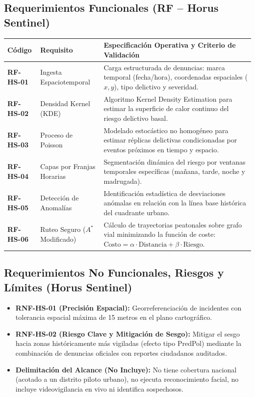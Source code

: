 \documentclass[11pt,a4paper]{article}
\begin{document}
\subsection{Requerimientos Funcionales (RF -- Horus Sentinel)}
\noindent\begin{tabularx}{\textwidth}{p{2.3cm} p{4.6cm} X}
\toprule
\textbf{Código} & \textbf{Requisito} & \textbf{Especificación Operativa y Criterio de Validación} \\
\midrule
\textbf{RF-HS-01} & Ingesta Espaciotemporal & Carga estructurada de denuncias: marca temporal (fecha/hora), coordenadas espaciales ($x,y$), tipo delictivo y severidad. \\
\addlinespace[3pt]
\textbf{RF-HS-02} & Densidad Kernel (KDE) & Algoritmo Kernel Density Estimation para estimar la superficie de calor continuo del riesgo delictivo basal. \\
\addlinespace[3pt]
\textbf{RF-HS-03} & Proceso de Poisson & Modelado estocástico no homogéneo para estimar réplicas delictivas condicionadas por eventos próximos en tiempo y espacio. \\
\addlinespace[3pt]
\textbf{RF-HS-04} & Capas por Franjas Horarias & Segmentación dinámica del riesgo por ventanas temporales específicas (mañana, tarde, noche y madrugada). \\
\addlinespace[3pt]
\textbf{RF-HS-05} & Detección de Anomalías & Identificación estadística de desviaciones anómalas en relación con la línea base histórica del cuadrante urbano. \\
\addlinespace[3pt]
\textbf{RF-HS-06} & Ruteo Seguro ($A^*$ Modificado) & Cálculo de trayectorias peatonales sobre grafo vial minimizando la función de coste: $\text{Costo} = \alpha \cdot \text{Distancia} + \beta \cdot \text{Riesgo}$. \\
\bottomrule
\end{tabularx}

\subsection{Requerimientos No Funcionales, Riesgos y Límites (Horus Sentinel)}
\begin{itemize}[leftmargin=*]
    \item \textbf{RNF-HS-01 (Precisión Espacial):} Georreferenciación de incidentes con tolerancia espacial máxima de 15 metros en el plano cartográfico.
    \item \textbf{RNF-HS-02 (Riesgo Clave y Mitigación de Sesgo):} Mitigar el sesgo hacia zonas históricamente más vigiladas (efecto tipo PredPol) mediante la combinación de denuncias oficiales con reportes ciudadanos auditados.
    \item \textbf{Delimitación del Alcance (No Incluye):} No tiene cobertura nacional (acotado a un distrito piloto urbano), no ejecuta reconocimiento facial, no incluye videovigilancia en vivo ni identifica sospechosos.
\end{itemize}
\end{document}
